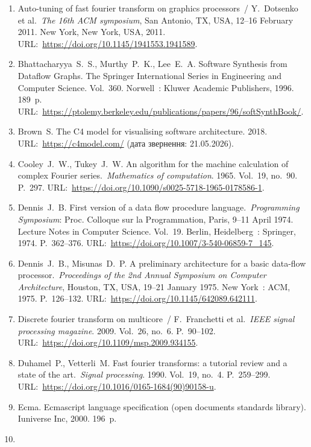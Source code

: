 \documentclass[
]{article}
\begin{document}
\begin{enumerate}
\def\labelenumi{\arabic{enumi})}
\setcounter{enumi}{4}
\item
  Auto-tuning of fast fourier transform on graphics processors~/
  Y.~Dotsenko et al.~\emph{The 16th ACM symposium}, San Antonio, TX,
  USA, 12--16 February 2011. New York, New York, USA, 2011.
  URL:~\url{https://doi.org/10.1145/1941553.1941589}.
\item
  Bhattacharyya~S.~S., Murthy~P.~K., Lee~E.~A. Software Synthesis from
  Dataflow Graphs. The Springer International Series in Engineering and
  Computer Science. Vol.~360. Norwell~: Kluwer Academic Publishers,
  1996. 189~p.
  URL:~\url{https://ptolemy.berkeley.edu/publications/papers/96/softSynthBook/}.
\item
  Brown~S. The C4 model for visualising software architecture. 2018.
  URL:~\url{https://c4model.com/} (дата звернення: 21.05.2026).
\item
  Cooley~J.~W., Tukey~J.~W. An algorithm for the machine calculation of
  complex Fourier series.~\emph{Mathematics of computation}. 1965.
  Vol.~19, no.~90. P.~297.
  URL:~\url{https://doi.org/10.1090/s0025-5718-1965-0178586-1}.
\item
  Dennis~J.~B. First version of a data flow procedure
  language.~\emph{Programming Symposium}: Proc. Colloque sur la
  Programmation, Paris, 9--11 April 1974. Lecture Notes in Computer
  Science. Vol.~19. Berlin, Heidelberg~: Springer, 1974. P.~362--376.
  URL:~\url{https://doi.org/10.1007/3-540-06859-7_145}.
\item
  Dennis~J.~B., Misunas~D.~P. A preliminary architecture for a basic
  data-flow processor.~\emph{Proceedings of the 2nd Annual Symposium on
  Computer Architecture}, Houston, TX, USA, 19--21 January 1975. New
  York~: ACM, 1975. P.~126--132.
  URL:~\url{https://doi.org/10.1145/642089.642111}.
\item
  Discrete fourier transform on multicore~/ F.~Franchetti et
  al.~\emph{IEEE signal processing magazine}. 2009. Vol.~26, no.~6.
  P.~90--102. URL:~\url{https://doi.org/10.1109/msp.2009.934155}.
\item
  Duhamel~P., Vetterli~M. Fast fourier transforms: a tutorial review and
  a state of the art.~\emph{Signal processing}. 1990. Vol.~19, no.~4.
  P.~259--299. URL:~\url{https://doi.org/10.1016/0165-1684(90)90158-u}.
\item
  Ecma. Ecmascript language specification (open documents standards
  library). Iuniverse Inc, 2000. 196~p.
\item

\end{enumerate}
\end{document}
